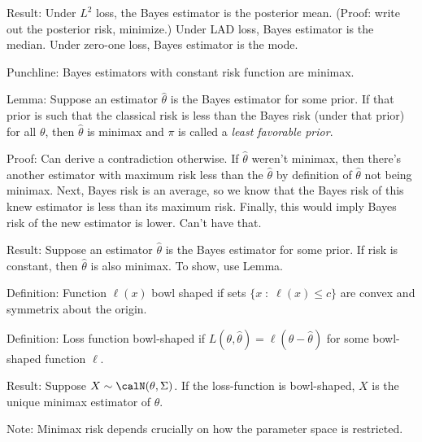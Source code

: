\documentclass[12pt]{article}
\theoremstyle{plain}
\theoremstyle{definition}
\theoremstyle{remark}
\begin{document}
Result:
Under $L^2$ loss, the Bayes estimator is the posterior mean.
(Proof: write out the posterior risk, minimize.)
Under LAD loss, Bayes estimator is the median.
Under zero-one loss, Bayes estimator is the mode.


Punchline:
Bayes estimators with constant risk function are minimax.


Lemma:
Suppose an estimator $\hat{\theta}$ is the Bayes estimator for some
prior.
If that prior is such that the classical risk is less than the Bayes
risk (under that prior) for all $\theta$, then $\hat{\theta}$ is minimax
and $\pi$ is called a \emph{least favorable prior}.

Proof:
Can derive a contradiction otherwise.
If $\hat{\theta}$ weren't minimax, then there's another estimator with
maximum risk less than the $\hat{\theta}$ by definition of
$\hat{\theta}$ not being minimax.
Next, Bayes risk is an average, so we know that the Bayes risk of this
knew estimator is less than its maximum risk.
Finally, this would imply Bayes risk of the new estimator is lower.
Can't have that.

Result:
Suppose an estimator $\hat{\theta}$ is the Bayes estimator for some
prior.
If risk is constant, then $\hat{\theta}$ is also minimax.
To show, use Lemma.


Definition:
Function $\ell(x)$ bowl shaped if sets $\{x\;:\;\ell(x)\leq c\}$ are
convex and symmetrix about the origin.


Definition:
Loss function bowl-shaped if
$L(\theta,\hat{\theta})=\ell(\theta-\hat{\theta})$ for some bowl-shaped
function $\ell$.

Result:
Suppose $X\sim \calN(\theta,\Sigma)$.
If the loss-function is bowl-shaped, $X$ is the unique minimax estimator
of $\theta$.

Note:
Minimax risk depends crucially on how the parameter space is restricted.
\end{document}
